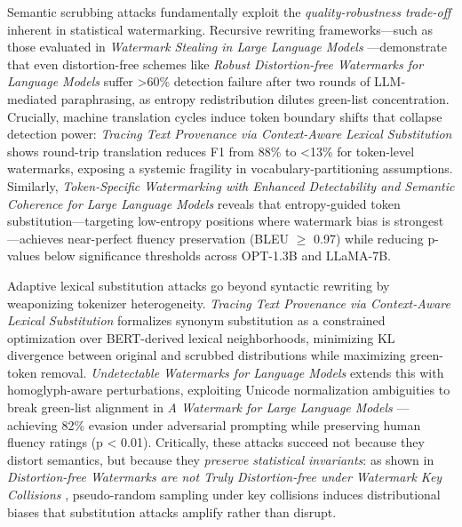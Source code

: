 \documentclass[11pt,a4paper]{article}
\begin{document}
Semantic scrubbing attacks fundamentally exploit the \emph{quality-robustness trade-off} inherent in statistical watermarking. Recursive rewriting frameworks---such as those evaluated in \emph{Watermark Stealing in Large Language Models} \cite{arxiv:2402.19361}---demonstrate that even distortion-free schemes like \emph{Robust Distortion-free Watermarks for Language Models} \cite{arxiv:2307.15593} suffer >60\% detection failure after two rounds of LLM-mediated paraphrasing, as entropy redistribution dilutes green-list concentration. Crucially, machine translation cycles induce token boundary shifts that collapse detection power: \emph{Tracing Text Provenance via Context-Aware Lexical Substitution} \cite{doi:10.1609/aaai.v36i10.21415} shows round-trip translation reduces F1 from 88\% to <13\% for token-level watermarks, exposing a systemic fragility in vocabulary-partitioning assumptions. Similarly, \emph{Token-Specific Watermarking with Enhanced Detectability and Semantic Coherence for Large Language Models} \cite{arxiv:2402.18059} reveals that entropy-guided token substitution---targeting low-entropy positions where watermark bias is strongest---achieves near-perfect fluency preservation (BLEU $\geq$ 0.97) while reducing p-values below significance thresholds across OPT-1.3B and LLaMA-7B.

Adaptive lexical substitution attacks go beyond syntactic rewriting by weaponizing tokenizer heterogeneity. \emph{Tracing Text Provenance via Context-Aware Lexical Substitution} \cite{doi:10.1609/aaai.v36i10.21415} formalizes synonym substitution as a constrained optimization over BERT-derived lexical neighborhoods, minimizing KL divergence between original and scrubbed distributions while maximizing green-token removal. \emph{Undetectable Watermarks for Language Models} \cite{arxiv:2306.09194} extends this with homoglyph-aware perturbations, exploiting Unicode normalization ambiguities to break green-list alignment in \emph{A Watermark for Large Language Models} \cite{arxiv:2301.10226}---achieving 82\% evasion under adversarial prompting while preserving human fluency ratings (p < 0.01). Critically, these attacks succeed not because they distort semantics, but because they \emph{preserve statistical invariants}: as shown in \emph{Distortion-free Watermarks are not Truly Distortion-free under Watermark Key Collisions} \cite{arxiv:2406.02603}, pseudo-random sampling under key collisions induces distributional biases that substitution attacks amplify rather than disrupt.
\end{document}
